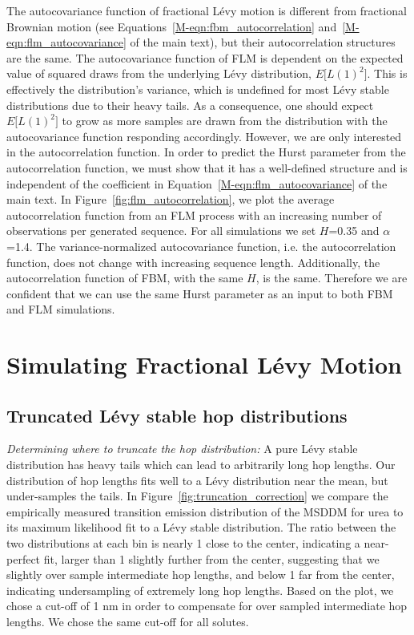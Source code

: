 \documentclass{article}
\begin{document}
  The autocovariance function of fractional L\'evy motion is different from fractional
  Brownian motion (see Equations~\ref{M-eqn:fbm_autocorrelation}
  and~\ref{M-eqn:flm_autocovariance} of the main text), but their autocorrelation 
  structures are the same. The autocovariance function of FLM is dependent on the 
  expected value of squared draws from the underlying L\'evy distribution, $E\big[L(1)^2\big]$. 
  This is effectively the distribution's variance, which is undefined for most 
  L\'evy stable distributions due to their heavy tails. As a consequence, one should 
  expect $E\big[L(1)^2\big]$ to grow as more samples are drawn from the distribution
  with the autocovariance function responding accordingly. 
  However, we are only interested in the autocorrelation function. In order to predict
  the Hurst parameter from the autocorrelation function, we must show that it has 
  a well-defined structure and is independent of the coefficient in 
  Equation~\ref{M-eqn:flm_autocovariance} of the main text. In Figure~\ref{fig:flm_autocorrelation}, 
  we plot the average autocorrelation function from an FLM process with an increasing 
  number of observations per generated sequence. For all simulations we set $H$=0.35 
  and $\alpha$=1.4. The variance-normalized autocovariance function, i.e. the autocorrelation
  function, does not change with increasing sequence length. Additionally, the
  autocorrelation function of FBM, with the same $H$, is the same. Therefore we are 
  confident that we can use the same Hurst parameter as an input to both FBM and FLM
  simulations.
  
  \newpage
  
  \section{Simulating Fractional L\'evy Motion}\label{section:sFLM}
  
  \subsection{Truncated L\'evy stable hop distributions}\label{section:truncation}
  
  \textit{Determining where to truncate the hop distribution:} A pure
  L\'evy stable distribution has heavy tails which can lead to arbitrarily
  long hop lengths. Our distribution of hop lengths fits well to a L\'evy
  distribution near the mean, but under-samples the tails. In 
  Figure~\ref{fig:truncation_correction} we compare the empirically 
  measured transition emission distribution of the MSDDM for urea to its maximum likelihood fit to
  a L\'evy stable distribution. The ratio between the two distributions 
  at each bin is nearly 1 close to the center, indicating a near-perfect
  fit, larger than 1 slightly further from the center, suggesting that 
  we slightly over sample intermediate hop lengths, and below 1 far from 
  the center, indicating undersampling of extremely long hop lengths.
  Based on the plot, we chose a cut-off of 1 nm in order to compensate for
  over sampled intermediate hop lengths. We chose the same cut-off for all
  solutes.
  
\end{document}
